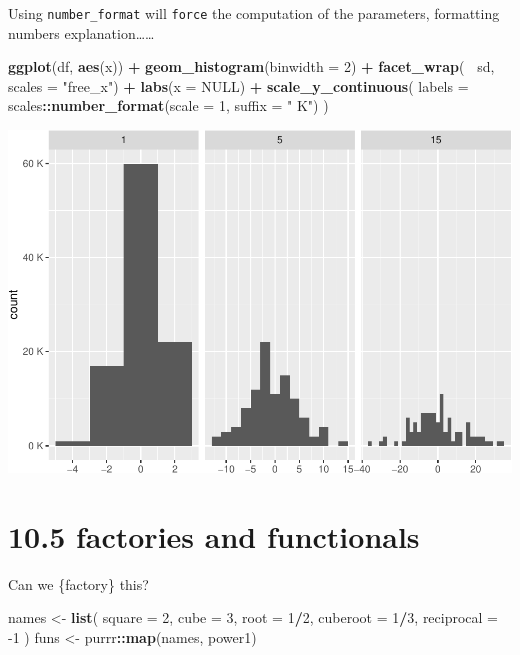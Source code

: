 \documentclass[]{book}
\newenvironment{Shaded}{\begin{snugshade}}{\end{snugshade}}
\newcommand{\DataTypeTok}[1]{\textcolor[rgb]{0.13,0.29,0.53}{#1}}
\newcommand{\DecValTok}[1]{\textcolor[rgb]{0.00,0.00,0.81}{#1}}
\newcommand{\KeywordTok}[1]{\textcolor[rgb]{0.13,0.29,0.53}{\textbf{#1}}}
\newcommand{\NormalTok}[1]{#1}
\newcommand{\OperatorTok}[1]{\textcolor[rgb]{0.81,0.36,0.00}{\textbf{#1}}}
\newcommand{\OtherTok}[1]{\textcolor[rgb]{0.56,0.35,0.01}{#1}}
\newcommand{\StringTok}[1]{\textcolor[rgb]{0.31,0.60,0.02}{#1}}
\begin{document}
Using \texttt{number\_format} will \texttt{force} the computation of the parameters, formatting numbers explanation\ldots{}\ldots{}

\begin{Shaded}
\begin{Highlighting}[]
\KeywordTok{ggplot}\NormalTok{(df, }\KeywordTok{aes}\NormalTok{(x)) }\OperatorTok{+}\StringTok{ }
\StringTok{  }\KeywordTok{geom_histogram}\NormalTok{(}\DataTypeTok{binwidth =} \DecValTok{2}\NormalTok{) }\OperatorTok{+}\StringTok{ }
\StringTok{  }\KeywordTok{facet_wrap}\NormalTok{(}\OperatorTok{~}\StringTok{ }\NormalTok{sd, }\DataTypeTok{scales =} \StringTok{"free_x"}\NormalTok{) }\OperatorTok{+}\StringTok{ }
\StringTok{  }\KeywordTok{labs}\NormalTok{(}\DataTypeTok{x =} \OtherTok{NULL}\NormalTok{) }\OperatorTok{+}
\StringTok{  }\KeywordTok{scale_y_continuous}\NormalTok{(}
  \DataTypeTok{labels =}\NormalTok{ scales}\OperatorTok{::}\KeywordTok{number_format}\NormalTok{(}\DataTypeTok{scale =} \DecValTok{1}\NormalTok{, }\DataTypeTok{suffix =} \StringTok{" K"}\NormalTok{) }
\NormalTok{)}
\end{Highlighting}
\end{Shaded}

\includegraphics{AdvancedR_Companion_files/figure-latex/unnamed-chunk-243-1.pdf}

\hypertarget{factories-and-functionals}{%
\section{10.5 factories and functionals}\label{factories-and-functionals}}

Can we \{factory\} this?

\begin{Shaded}
\begin{Highlighting}[]
\NormalTok{names <-}\StringTok{ }\KeywordTok{list}\NormalTok{(}
  \DataTypeTok{square =} \DecValTok{2}\NormalTok{, }
  \DataTypeTok{cube =} \DecValTok{3}\NormalTok{, }
  \DataTypeTok{root =} \DecValTok{1}\OperatorTok{/}\DecValTok{2}\NormalTok{, }
  \DataTypeTok{cuberoot =} \DecValTok{1}\OperatorTok{/}\DecValTok{3}\NormalTok{, }
  \DataTypeTok{reciprocal =} \DecValTok{-1}
\NormalTok{)}
\NormalTok{funs <-}\StringTok{ }\NormalTok{purrr}\OperatorTok{::}\KeywordTok{map}\NormalTok{(names, power1)}
\end{Highlighting}
\end{Shaded}
\end{document}
